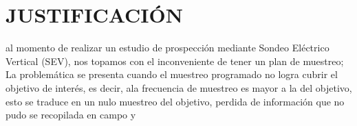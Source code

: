 \chapter{JUSTIFICACIÓN}

al momento de realizar un estudio de prospección mediante Sondeo Eléctrico Vertical (SEV), nos topamos con el inconveniente de tener un plan de muestreo;
La problemática se presenta cuando el muestreo programado no logra cubrir el objetivo de interés, es decir, ala frecuencia de muestreo es mayor a la del objetivo, esto se traduce en un nulo muestreo del objetivo, perdida de información que no pudo se recopilada en campo y \\
